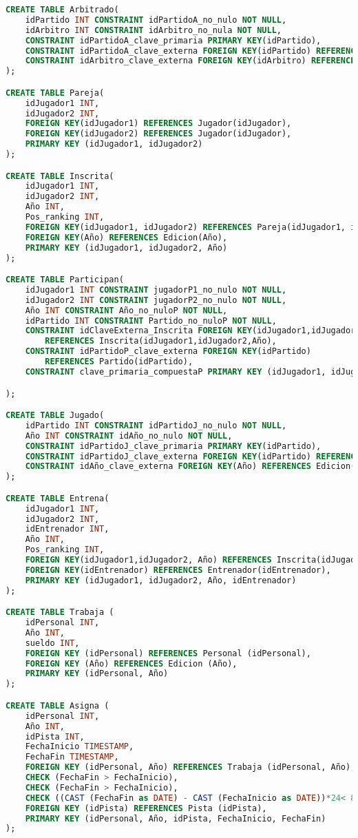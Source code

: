 \begin{lstlisting}[language=sql]
CREATE TABLE Arbitrado(
	idPartido INT CONSTRAINT idPartidoA_no_nulo NOT NULL,
	idArbitro INT CONSTRAINT idArbitro_no_nula NOT NULL,
	CONSTRAINT idPartidoA_clave_primaria PRIMARY KEY(idPartido),
	CONSTRAINT idPartidoA_clave_externa FOREIGN KEY(idPartido) REFERENCES Partido(idPartido),
	CONSTRAINT idArbitro_clave_externa FOREIGN KEY(idArbitro) REFERENCES Arbitro(idArbitro)
);

CREATE TABLE Pareja(
	idJugador1 INT,
	idJugador2 INT,
	FOREIGN KEY(idJugador1) REFERENCES Jugador(idJugador),
	FOREIGN KEY(idJugador2) REFERENCES Jugador(idJugador),
	PRIMARY KEY (idJugador1, idJugador2)
);

CREATE TABLE Inscrita(
	idJugador1 INT,
	idJugador2 INT,
	Año INT,
	Pos_ranking INT,
	FOREIGN KEY(idJugador1, idJugador2) REFERENCES Pareja(idJugador1, idJugador2),
	FOREIGN KEY(Año) REFERENCES Edicion(Año),
	PRIMARY KEY (idJugador1, idJugador2, Año)
);

CREATE TABLE Participan(
	idJugador1 INT CONSTRAINT jugadorP1_no_nulo NOT NULL,
	idJugador2 INT CONSTRAINT jugadorP2_no_nulo NOT NULL,
	Año INT CONSTRAINT Año_no_nuloP NOT NULL,
	idPartido INT CONSTRAINT Partido_no_nuloP NOT NULL,
	CONSTRAINT idClaveExterna_Inscrita FOREIGN KEY(idJugador1,idJugador2,Año)
		REFERENCES Inscrita(idJugador1,idJugador2,Año),
	CONSTRAINT idPartidoP_clave_externa FOREIGN KEY(idPartido)
		REFERENCES Partido(idPartido),
	CONSTRAINT clave_primaria_compuestaP PRIMARY KEY (idJugador1, idJugador2, Año,idPartido)

);

CREATE TABLE Jugado(
	idPartido INT CONSTRAINT idPartidoJ_no_nulo NOT NULL,
	Año INT CONSTRAINT idAño_no_nulo NOT NULL,
	CONSTRAINT idPartidoJ_clave_primaria PRIMARY KEY(idPartido),
	CONSTRAINT idPartidoJ_clave_externa FOREIGN KEY(idPartido) REFERENCES Partido(idPartido),
	CONSTRAINT idAño_clave_externa FOREIGN KEY(Año) REFERENCES Edicion(Año)
);

CREATE TABLE Entrena(
	idJugador1 INT,
	idJugador2 INT,
	idEntrenador INT,
	Año INT,
	Pos_ranking INT,
	FOREIGN KEY(idJugador1,idJugador2, Año) REFERENCES Inscrita(idJugador1,idJugador2, Año),
	FOREIGN KEY(idEntrenador) REFERENCES Entrenador(idEntrenador),
	PRIMARY KEY (idJugador1, idJugador2, Año, idEntrenador)
);

CREATE TABLE Trabaja (
	idPersonal INT,
	Año INT,
	sueldo INT,
	FOREIGN KEY (idPersonal) REFERENCES Personal (idPersonal),
	FOREIGN KEY (Año) REFERENCES Edicion (Año),
	PRIMARY KEY (idPersonal, Año)
);

CREATE TABLE Asigna (
	idPersonal INT,
	Año INT,
	idPista INT,
	FechaInicio TIMESTAMP,
	FechaFin TIMESTAMP,
	FOREIGN KEY (idPersonal, Año) REFERENCES Trabaja (idPersonal, Año),
	CHECK (FechaFin > FechaInicio),
	CHECK (FechaFin > FechaInicio),
	CHECK ((CAST (FechaFin as DATE) - CAST (FechaInicio as DATE))*24< 8),
	FOREIGN KEY (idPista) REFERENCES Pista (idPista),
	PRIMARY KEY (idPersonal, Año, idPista, FechaInicio, FechaFin)
);


\end{lstlisting}
